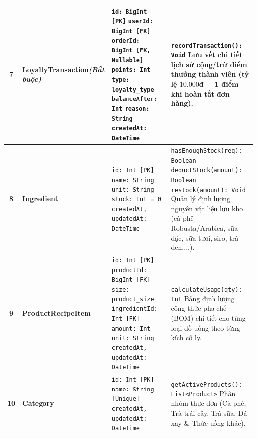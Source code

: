 \documentclass[12pt,a4paper]{article}
\begin{document}
\begin{xltabular}{\textwidth}{|c|>{\raggedright\arraybackslash}p{3.2cm}|>{\raggedright\arraybackslash}p{4.2cm}|>{\raggedright\arraybackslash}X|}
\textbf{7} & \textbf{LoyaltyTransaction}\newline\textit{(Bắt buộc)} & 
\texttt{id: BigInt [PK]}\newline
\texttt{userId: BigInt [FK]}\newline
\texttt{orderId: BigInt [FK, Nullable]}\newline
\texttt{points: Int}\newline
\texttt{type: loyalty\_type}\newline
\texttt{balanceAfter: Int}\newline
\texttt{reason: String}\newline
\texttt{createdAt: DateTime} & 
\texttt{recordTransaction(): Void}\newline
Lưu vết chi tiết lịch sử cộng/trừ điểm thưởng thành viên (tỷ lệ $10.000$đ = 1 điểm khi hoàn tất đơn hàng). \\
\hline

\textbf{8} & \textbf{Ingredient} & 
\texttt{id: Int [PK]}\newline
\texttt{name: String}\newline
\texttt{unit: String}\newline
\texttt{stock: Int = 0}\newline
\texttt{createdAt, updatedAt: DateTime} & 
\texttt{hasEnoughStock(req): Boolean}\newline
\texttt{deductStock(amount): Boolean}\newline
\texttt{restock(amount): Void}\newline
Quản lý định lượng nguyên vật liệu lưu kho (cà phê Robusta/Arabica, sữa đặc, sữa tươi, siro, trà đen,...). \\
\hline

\textbf{9} & \textbf{ProductRecipeItem} & 
\texttt{id: Int [PK]}\newline
\texttt{productId: BigInt [FK]}\newline
\texttt{size: product\_size}\newline
\texttt{ingredientId: Int [FK]}\newline
\texttt{amount: Int}\newline
\texttt{unit: String}\newline
\texttt{createdAt, updatedAt: DateTime} & 
\texttt{calculateUsage(qty): Int}\newline
Bảng định lượng công thức pha chế (BOM) chi tiết cho từng loại đồ uống theo từng kích cỡ ly. \\
\hline

\textbf{10} & \textbf{Category} & 
\texttt{id: Int [PK]}\newline
\texttt{name: String [Unique]}\newline
\texttt{createdAt, updatedAt: DateTime} & 
\texttt{getActiveProducts(): List<Product>}\newline
Phân nhóm thực đơn (Cà phê, Trà trái cây, Trà sữa, Đá xay \& Thức uống khác). \\
\hline


\end{xltabular}
\end{document}

